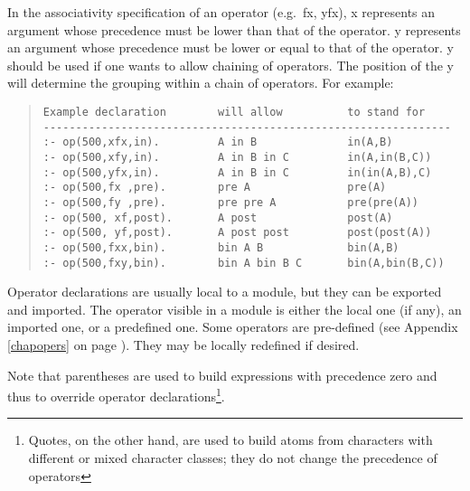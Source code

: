 In the associativity specification of an operator (e.g.\ fx, yfx), x
represents an argument whose precedence must be lower than that of the
operator.  y represents an argument whose precedence must be lower or
equal to that of the operator.  y should be used if one wants to allow
chaining of operators.  The position of the y will determine the
grouping within a chain of operators. For example:
\begin{quote}\begin{verbatim}
Example declaration        will allow          to stand for
---------------------------------------------------------------
:- op(500,xfx,in).         A in B              in(A,B)
:- op(500,xfy,in).         A in B in C         in(A,in(B,C))
:- op(500,yfx,in).         A in B in C         in(in(A,B),C)
:- op(500,fx ,pre).        pre A               pre(A)
:- op(500,fy ,pre).        pre pre A           pre(pre(A))
:- op(500, xf,post).       A post              post(A)
:- op(500, yf,post).       A post post         post(post(A))
:- op(500,fxx,bin).        bin A B             bin(A,B)
:- op(500,fxy,bin).        bin A bin B C       bin(A,bin(B,C))
\end{verbatim}\end{quote}

Operator declarations are usually local to a module, but they can be
exported and imported.  The operator visible in a module is either the
local one (if any), an imported one, or a predefined one.
Some operators are pre-defined (see Appendix \ref{chapopers} on
page \pageref{chapopers}).  They may be locally redefined if desired.

Note that parentheses are used to build expressions with precedence zero
and thus to override operator declarations\footnote{
Quotes, on the other hand, are used to build atoms from characters
with different or mixed character classes; they do not change
the precedence of operators}.


